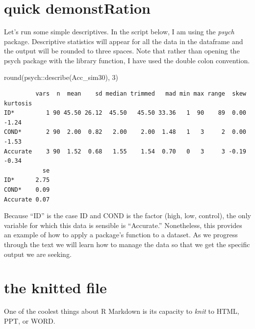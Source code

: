 \documentclass[
  11pt,
]{book}
\newenvironment{Shaded}{\begin{snugshade}}{\end{snugshade}}
\newcommand{\DecValTok}[1]{\textcolor[rgb]{0.00,0.00,0.81}{#1}}
\newcommand{\FunctionTok}[1]{\textcolor[rgb]{0.00,0.00,0.00}{#1}}
\newcommand{\NormalTok}[1]{#1}
\newcommand{\SpecialCharTok}[1]{\textcolor[rgb]{0.00,0.00,0.00}{#1}}
\begin{document}
\hypertarget{quick-demonstration}{%
\section{quick demonstRation}\label{quick-demonstration}}

Let's run some simple descriptives. In the script below, I am using the \emph{psych} package. Descriptive statistics will appear for all the data in the dataframe and the output will be rounded to three spaces. Note that rather than opening the psych package with the library function, I have used the double colon convention.

\begin{Shaded}
\begin{Highlighting}[]
\FunctionTok{round}\NormalTok{(psych}\SpecialCharTok{::}\FunctionTok{describe}\NormalTok{(Acc\_sim30), }\DecValTok{3}\NormalTok{)}
\end{Highlighting}
\end{Shaded}

\begin{verbatim}
         vars  n  mean    sd median trimmed   mad min max range  skew kurtosis
ID*         1 90 45.50 26.12  45.50   45.50 33.36   1  90    89  0.00    -1.24
COND*       2 90  2.00  0.82   2.00    2.00  1.48   1   3     2  0.00    -1.53
Accurate    3 90  1.52  0.68   1.55    1.54  0.70   0   3     3 -0.19    -0.34
           se
ID*      2.75
COND*    0.09
Accurate 0.07
\end{verbatim}

Because ``ID'' is the case ID and COND is the factor (high, low, control), the only variable for which this data is sensible is ``Accurate.'' Nonetheless, this provides an example of how to apply a package's function to a dataset. As we progress through the text we will learn how to manage the data so that we get the specific output we are seeking.

\hypertarget{the-knitted-file}{%
\section{the knitted file}\label{the-knitted-file}}

One of the coolest things about R Markdown is its capacity to \emph{knit} to HTML, PPT, or WORD.
\end{document}
